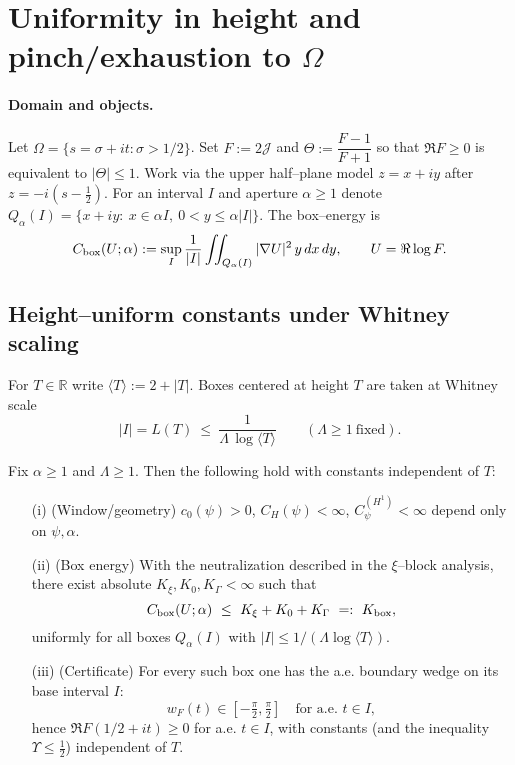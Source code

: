 
\section*{Uniformity in height and pinch/exhaustion to $\Omega$}

\paragraph{Domain and objects.}
Let $\Omega=\{s=\sigma+it:\sigma>1/2\}$. Set $F:=2\mathcal J$ and $\Theta:=\dfrac{F-1}{F+1}$ so that $\Re F\ge 0$ is equivalent to $|\Theta|\le 1$. Work via the upper half–plane model $z=x+iy$ after $z=-i(s-\tfrac12)$. For an interval $I$ and aperture $\alpha\ge1$ denote $Q_\alpha(I)=\{x+iy:\ x\in \alpha I,\ 0<y\le \alpha|I|\}$. The box–energy is
\[
C_{\rm box}(U;\alpha):=\sup_I \frac{1}{|I|}\iint_{Q_\alpha(I)} |\nabla U|^2\,y\,dx\,dy,\qquad U=\Re\log F.
\]

\subsection*{Height–uniform constants under Whitney scaling}

For $T\in\mathbb{R}$ write $\langle T\rangle:=2+|T|$. Boxes centered at height $T$ are taken at Whitney scale
\[|I|=L(T)\ \le\ \frac{1}{\Lambda\,\log\langle T\rangle}\qquad(\Lambda\ge 1\ \text{fixed}).\]

\begin{proposition}\label{prop:uniform-unif}
Fix $\alpha\ge 1$ and $\Lambda\ge 1$. Then the following hold with constants independent of $T$:
\begin{itemize}
\item[(i)] (Window/geometry) $c_0(\psi)>0$, $C_H(\psi)<\infty$, $C_\psi^{(H^1)}<\infty$ depend only on $\psi,\alpha$.
\item[(ii)] (Box energy) With the neutralization described in the $\xi$–block analysis, there exist absolute $K_\xi, K_0, K_\Gamma<\infty$ such that
\[C_{\rm box}(U;\alpha)\ \le\ K_\xi+K_0+K_\Gamma\ =:\ K_{\rm box},\]
uniformly for all boxes $Q_\alpha(I)$ with $|I|\le 1/(\Lambda\log\langle T\rangle)$.
\item[(iii)] (Certificate) For every such box one has the a.e. boundary wedge on its base interval $I$:
\[w_F(t)\in[-\tfrac{\pi}{2},\tfrac{\pi}{2}]\quad\text{for a.e. }t\in I,\]
hence $\Re F(1/2+it)\ge 0$ for a.e. $t\in I$, with constants (and the inequality $\Upsilon\le \tfrac12$) independent of $T$.
\end{itemize}
\end{proposition}

